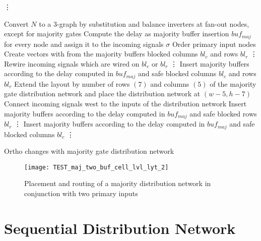 \begin{algorithm}[H]
	\vdots
	
	\begin{algorithmic}
		\State Convert $N$ to a 3-graph by substitution and balance inverters at fan-out nodes, except for majority gates
		\State Compute the delay as majority buffer insertion $buf_{maj}$ for every node and assign it to the incoming signals $\sigma$
		\State Order primary input nodes
		\State Create vectors with from the majority buffers blocked columns $bl_c$ and rows $bl_r$
		\State \vdots
		\State Rewire incoming signals which are wired on $bl_c$ or $bl_r$
		\State \vdots
		\EndIf
		\State Insert majority buffers according to the delay computed in $buf_{maj}$ and safe blocked columns $bl_c$ and rows $bl_r$
		\State Extend the layout by number of rows $(7)$ and columns $(5)$ of the majority gate distribution network and place the distribution network at $(w-5, h-7)$
		\State Connect incoming signals west to the inputs of the distribution network
		\State Insert majority buffers according to the delay computed in $buf_{maj}$ and safe blocked rows $bl_r$
		\State \vdots
		\State Insert majority buffers according to the delay computed in $buf_{maj}$ and safe blocked columns $bl_c$
		\State \vdots
		\EndIf
		
		\EndFor
	\end{algorithmic}
	\caption{Ortho changes with majority gate distribution network}\label{alg:majority_network}
\end{algorithm}

\begin{sidewaysfigure}
	\centering
	\texttt{[image: TEST\_maj\_two\_buf\_cell\_lvl\_lyt\_2]}
	\caption{Placement and routing of a majority distribution network in conjunction with two primary inputs}\label{fig:majority_with_buf}
\end{sidewaysfigure}


\section{Sequential Distribution Network}

